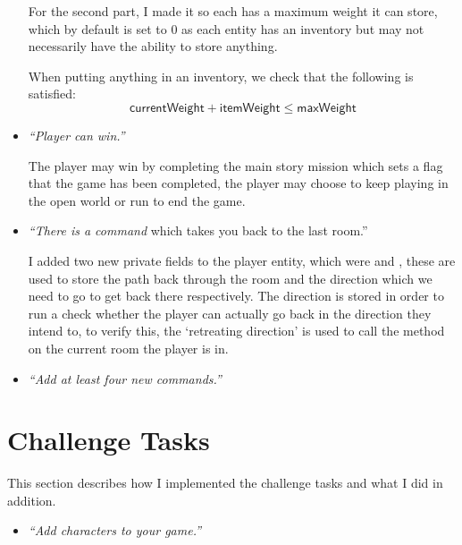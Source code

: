 \documentclass{article}
\begin{document}
\begin{multicols}{2}
\begin{itemize}[leftmargin=*]
                    For the second part, I made it so each  has a maximum weight it can store, which by default is set to $0$ as each entity has an inventory but may not necessarily have the ability to store anything.

                    When putting anything in an inventory, we check that the following is satisfied:
                    $$
                        \textsf{currentWeight} + \textsf{itemWeight} \le \textsf{maxWeight}
                    $$
                
                \item \textit{``Player can win.''}
                
                    The player may win by completing the main story mission which sets a flag that the game has been completed, the player may choose to keep playing in the open world or run  to end the game.

                \item \textit{``There is a command}  {which takes you back to the last room.''}
                
                    I added two new private fields to the player entity, which were  and , these are used to store the path back through the room and the direction which we need to go to get back there respectively. The direction is stored in order to run a check whether the player can actually go back in the direction they intend to, to verify this, the `retreating direction' is used to call the method  on the current room the player is in.

                \item \textit{``Add at least four new commands.''}
                
            \end{itemize}

        \section{Challenge Tasks}

            This section describes how I implemented the challenge tasks and what I did in addition.

            \begin{itemize}[leftmargin=*]
                \item \textit{``Add characters to your game.''}
                

\end{itemize}
\end{multicols}
\end{document}

